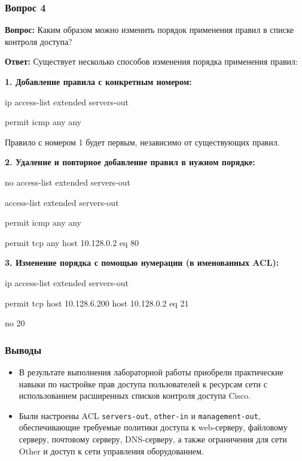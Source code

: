 \begin{frame}
\frametitle{Вопрос 4}
\parbox{\textwidth}{
\textbf{Вопрос:} Каким образом можно изменить порядок применения правил в списке контроля доступа?

\textbf{Ответ:} Существует несколько способов изменения порядка применения правил:

\textbf{1. Добавление правила с конкретным номером:}

\ttfamily ip access-list extended servers-out

 permit icmp any any

Правило с номером 1 будет первым, независимо от существующих правил.

\textbf{2. Удаление и повторное добавление правил в нужном порядке:}

\ttfamily no access-list extended servers-out

\ttfamily access-list extended servers-out

\ttfamily permit icmp any any

\ttfamily permit tcp any host 10.128.0.2 eq 80

\textbf{3. Изменение порядка с помощью нумерации (в именованных ACL):}

\ttfamily ip access-list extended servers-out

 permit tcp host 10.128.6.200 host 10.128.0.2 eq 21

\ttfamily no 20
}
\end{frame}

\begin{frame}
\frametitle{Выводы}
\begin{itemize}
    \item В результате выполнения лабораторной работы приобрели практические навыки по настройке прав доступа пользователей к ресурсам сети с использованием расширенных списков контроля доступа Cisco.
    \item Были настроены ACL \texttt{servers-out}, \texttt{other-in} и \texttt{management-out}, обеспечивающие требуемые политики доступа к web-серверу, файловому серверу, почтовому серверу, DNS-серверу, а также ограничения для сети Other и доступ к сети управления оборудованием.
\end{itemize}
\end{frame}


